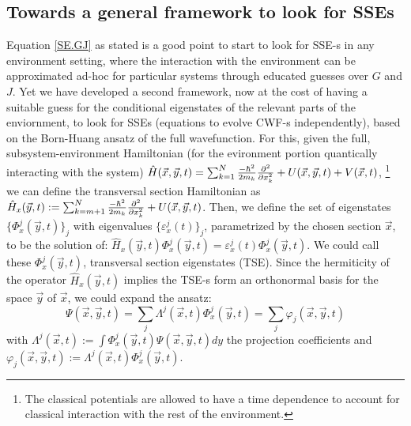 \documentclass[11pt, a4paper]{article} %
\begin{document}
\subsection*{Towards a general framework to look for SSEs}
Equation \eqref{SE.GJ} as stated is a good point to start to look for SSE-s in any environment setting, where the interaction with the environment can be approximated ad-hoc for particular systems through educated guesses over $G$ and $J$. Yet we have developed a second framework, now at the cost of having a suitable guess for the conditional eigenstates of the relevant parts of the enviornment, to look for SSEs (equations to evolve CWF-s independently), based on the Born-Huang ansatz of the full wavefunction. For this, given the full, subsystem-environment Hamiltonian (for the evironment portion quantically interacting with the system) $\hat{H}(\vec{x},\vec{y},t)=\sum_{k=1}^N \frac{-\hbar^2}{2m_k}\pdv[2]{}{x_k} + U(\vec{x},\vec{y},t)+V(\vec{x},t)$, \footnote{The classical potentials are allowed to have a time dependence to account for classical interaction with the rest of the environment.} we can define the transversal section Hamiltonian as $\hat{H}_x(\vec{y},t):=\sum_{k=m+1}^N\frac{-\hbar^2}{2m_k}\pdv[2]{}{x_k}+U(\vec{x},\vec{y},t)$. Then, we define the set of eigenstates $\{\Phi^j_x(\vec{y},t)\}_j$ with eigenvalues $\{\varepsilon_x^j(t)\}_j$, parametrized by the chosen section $\vec{x}$, to be the solution of: $\hat{H}_x(\vec{y},t)\Phi^j_x(\vec{y},t)=\varepsilon_x^j(t)\Phi^j_x(\vec{y},t)$. We could call these $\Phi^j_x(\vec{y},t)$, transversal section eigenstates (TSE). Since the hermiticity of the operator $\hat{H}_x(\vec{y},t)$ implies the TSE-s form an orthonormal basis for the space $\vec{y}$ of $\vec{x}$, we could expand the ansatz:
\begin{equation}
\Psi(\vec{x},\vec{y},t)=\sum_j \Lambda^j(\vec{x},t)\Phi_x^j(\vec{y},t)=\sum_j \varphi_j(\vec{x},\vec{y},t)
\end{equation}
with $\Lambda^j(\vec{x},t):=\int\Phi^j_x(\vec{y},t)\Psi(\vec{x},\vec{y},t)dy$ the projection coefficients and $\varphi_j(\vec{x},\vec{y},t):=\Lambda^j(\vec{x},t)\Phi^j_x(\vec{y},t)$.
\end{document}

